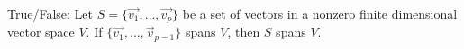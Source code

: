 \documentclass{ximera}
\begin{document}
  \begin{question} True/False: Let $S=\{\vec{v_1}, \dots,\vec{v_p}\}$ be a set of  vectors in a nonzero finite dimensional vector space $V$. If $\{\vec{v_1}, \dots,\vec{v}_{p-1}\}$ spans $V$, then $S$ spans $V$.
  	
  \begin{multipleChoice}
  	\end{multipleChoice}
  	
  	\end{question}	
   
     
  
\end{document}
